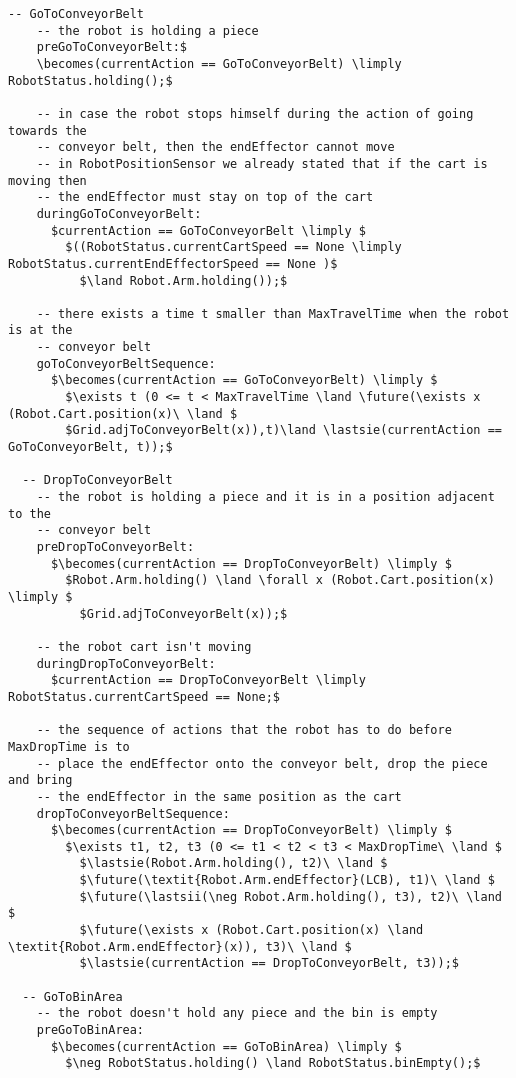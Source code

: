 \begin{lstlisting}[fontadjust, mathescape, frame=single]
  -- GoToConveyorBelt
    -- the robot is holding a piece
    preGoToConveyorBelt:$
    \becomes(currentAction == GoToConveyorBelt) \limply RobotStatus.holding();$
    
    -- in case the robot stops himself during the action of going towards the 
    -- conveyor belt, then the endEffector cannot move 
    -- in RobotPositionSensor we already stated that if the cart is moving then 
    -- the endEffector must stay on top of the cart
    duringGoToConveyorBelt:
      $currentAction == GoToConveyorBelt \limply $
        $((RobotStatus.currentCartSpeed == None \limply RobotStatus.currentEndEffectorSpeed == None )$
          $\land Robot.Arm.holding());$

    -- there exists a time t smaller than MaxTravelTime when the robot is at the 
    -- conveyor belt
    goToConveyorBeltSequence:
      $\becomes(currentAction == GoToConveyorBelt) \limply $
        $\exists t (0 <= t < MaxTravelTime \land \future(\exists x (Robot.Cart.position(x)\ \land $
        $Grid.adjToConveyorBelt(x)),t)\land \lastsie(currentAction == GoToConveyorBelt, t));$
      
  -- DropToConveyorBelt
    -- the robot is holding a piece and it is in a position adjacent to the 
    -- conveyor belt
    preDropToConveyorBelt:
      $\becomes(currentAction == DropToConveyorBelt) \limply $
        $Robot.Arm.holding() \land \forall x (Robot.Cart.position(x) \limply $
          $Grid.adjToConveyorBelt(x));$
    
    -- the robot cart isn't moving
    duringDropToConveyorBelt:
      $currentAction == DropToConveyorBelt \limply RobotStatus.currentCartSpeed == None;$

    -- the sequence of actions that the robot has to do before MaxDropTime is to 
    -- place the endEffector onto the conveyor belt, drop the piece and bring  
    -- the endEffector in the same position as the cart
    dropToConveyorBeltSequence:
      $\becomes(currentAction == DropToConveyorBelt) \limply $
        $\exists t1, t2, t3 (0 <= t1 < t2 < t3 < MaxDropTime\ \land $
          $\lastsie(Robot.Arm.holding(), t2)\ \land $
          $\future(\textit{Robot.Arm.endEffector}(LCB), t1)\ \land $
          $\future(\lastsii(\neg Robot.Arm.holding(), t3), t2)\ \land $
          $\future(\exists x (Robot.Cart.position(x) \land \textit{Robot.Arm.endEffector}(x)), t3)\ \land $
          $\lastsie(currentAction == DropToConveyorBelt, t3));$

  -- GoToBinArea
    -- the robot doesn't hold any piece and the bin is empty
    preGoToBinArea:
      $\becomes(currentAction == GoToBinArea) \limply $
        $\neg RobotStatus.holding() \land RobotStatus.binEmpty();$
    

\end{lstlisting}
